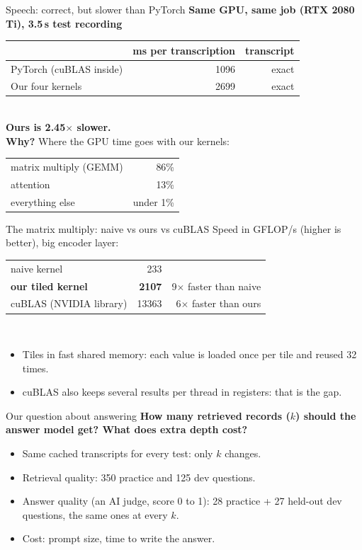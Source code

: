\documentclass[aspectratio=169,12pt]{beamer}
\begin{document}
\begin{frame}{Speech: correct, but slower than PyTorch}
\textbf{Same GPU, same job (RTX 2080 Ti), 3.5\,s test recording}\\[3mm]
\begin{tabular}{lrr}
\toprule
 & ms per transcription & transcript\\
\midrule
PyTorch (cuBLAS inside) & 1096 & exact\\
Our four kernels & 2699 & exact\\
\bottomrule
\end{tabular}\\[2mm]
\textbf{Ours is 2.45$\times$ slower.}\\[5mm]
\textbf{Why?} Where the GPU time goes with our kernels:\\[1mm]
\begin{tabular}{lr}
matrix multiply (GEMM) & 86\%\\
attention & 13\%\\
everything else & under 1\%\\
\end{tabular}
\end{frame}

\begin{frame}{The matrix multiply: naive vs ours vs cuBLAS}
Speed in GFLOP/s (higher is better), big encoder layer:\\[3mm]
\begin{tabular}{lrr}
\toprule
naive kernel & 233 & \\
\textbf{our tiled kernel} & \textbf{2107} & 9$\times$ faster than naive\\
cuBLAS (NVIDIA library) & 13363 & 6$\times$ faster than ours\\
\bottomrule
\end{tabular}\\[5mm]
\begin{itemize}
\item Tiles in fast shared memory: each value is loaded once per tile and reused 32 times.
\item cuBLAS also keeps several results per thread in registers: that is the gap.
\end{itemize}
\end{frame}

\begin{frame}{Our question about answering}
\textbf{How many retrieved records ($k$) should the answer model get? What does extra depth cost?}\\[4mm]
\begin{itemize}
\item Same cached transcripts for every test: only $k$ changes.
\item Retrieval quality: 350 practice and 125 dev questions.
\item Answer quality (an AI judge, score 0 to 1): 28 practice + 27 held-out dev questions, the same ones at every $k$.
\item Cost: prompt size, time to write the answer.
\end{itemize}
\end{frame}
\end{document}
